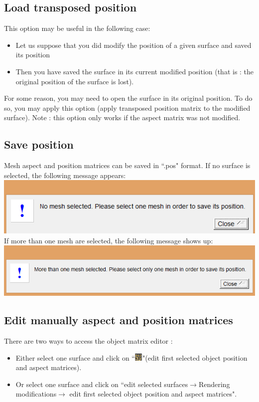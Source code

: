 \subsection{Load transposed position}
This option may be useful in the following case:
\begin{itemize}
\item Let us suppose that you did modify the position of a given surface and saved its position
\item Then you have saved the surface in its current modified position (that is : the original position of the
surface is lost).
\end{itemize}

For some reason, you may need to open the surface in its original position. To do so, you may apply this option (apply transposed position matrix to the modified surface).
Note : this option only works if the aspect matrix was not modified.

\subsection{Save position}
Mesh aspect and position matrices can be saved in ``.pos" format. If no surface is selected, the
following message appears:\\
\includegraphics[scale=0.5]{images/File/save_pos1.png}
\\
If more than one mesh are selected, the following message shows up:\\
\includegraphics[scale=0.5]{images/File/save_pos2png.png}

\subsection{Edit manually aspect and position matrices}
There are two ways to access the object matrix editor :
\begin{itemize}

\item Either select one surface and click on ``\includegraphics[scale=0.7]{images/pixmap/mat.png}"(edit first selected object position and aspect matrices).
\item Or select one surface and click on ``edit selected surfaces$\rightarrow$Rendering modifications$\rightarrow$ edit first
selected object position and aspect matrices".
\end{itemize}



